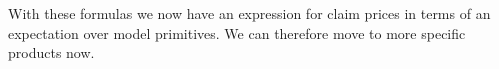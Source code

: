 \documentclass[12pt]{article}
\begin{document}

	
	
	With these formulas we now have an expression for claim prices in terms of an expectation over model primitives. We can therefore move to more specific products now.
	
\end{document}
